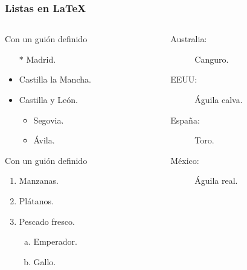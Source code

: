 \begin{frame}
    \frametitle{Listas en \LaTeX{}}

    \begin{columns}[onlytextwidth]
        \begin{column}{0.48\textwidth}
            \centering
            \begin{exampleblock}{Con un guión definido} %
                \begin{itemize}
                    \item[$*$] Madrid.
                    \item Castilla la Mancha.
                    \item Castilla y León.
                    \begin{itemize}
                        \item Segovia.
                        \item Ávila.
                    \end{itemize}
                \end{itemize}
            \end{exampleblock}
        \begin{exampleblock}{Con un guión definido} %
            \begin{enumerate}[1.]
                \item Manzanas.
                \item Plátanos.
                \item Pescado fresco.
                \begin{enumerate}[a)]
                    \item Emperador.
                    \item Gallo.
                \end{enumerate}
            \end{enumerate}
        \end{exampleblock}      
        \end{column}
        
        \begin{column}{0.46\textwidth}
            \begin{exampleblock}{} %
                \begin{description}
                    \item[Australia:] Canguro.
                    \item[EEUU:] Águila calva.
                    \item[España:] Toro.
                    \item[México:] Águila real.
                \end{description}
            \end{exampleblock}
        \end{column}
    \end{columns} 
\end{frame}


